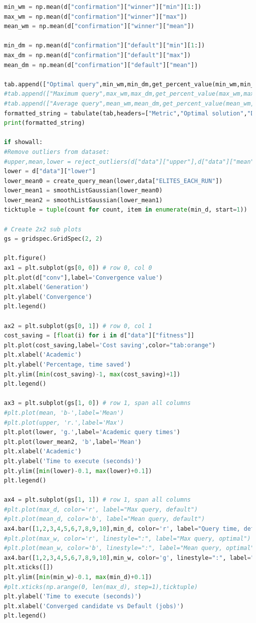 \documentclass[a4paper,english]{report}
\begin{document}
\begin{lstlisting}[language=Python, caption=plotting.py\, easily allows for visualization of results.]
min_wm = np.mean(d["confirmation"]["winner"]["min"][1:])
max_wm = np.mean(d["confirmation"]["winner"]["max"])
mean_wm = np.mean(d["confirmation"]["winner"]["mean"])

min_dm = np.mean(d["confirmation"]["default"]["min"][1:])
max_dm = np.mean(d["confirmation"]["default"]["max"])
mean_dm = np.mean(d["confirmation"]["default"]["mean"])

tab.append(["Optimal query",min_wm,min_dm,get_percent_value(min_wm,min_dm)])
#tab.append(["Maximum query",max_wm,max_dm,get_percent_value(max_wm,max_dm)])
#tab.append(["Average query",mean_wm,mean_dm,get_percent_value(mean_wm,mean_dm)])
formatted_string = tabulate(tab,headers=["Metric","Optimal solution","Default","Overhead saved"])
print(formatted_string)

if showall:
#Remove outliers from dataset:
#upper,mean,lower = reject_outliers(d["data"]["upper"],d["data"]["mean"],d["data"]["lower"])
lower = d["data"]["lower"]
lower_mean0 = create_query_mean(lower,data["ELITES_EACH_RUN"])
lower_mean1 = smoothListGaussian(lower_mean0)
lower_mean2 = smoothListGaussian(lower_mean1)
ticktuple = tuple(count for count, item in enumerate(min_d, start=1))

# Create 2x2 sub plots
gs = gridspec.GridSpec(2, 2)

plt.figure()
ax1 = plt.subplot(gs[0, 0]) # row 0, col 0
plt.plot(d["conv"],label='Convergence value')
plt.xlabel('Generation')
plt.ylabel('Convergence')
plt.legend()

ax2 = plt.subplot(gs[0, 1]) # row 0, col 1
cost_saving = [float(i) for i in d["data"]["fitness"]]
plt.plot(cost_saving,label='Cost saving',color="tab:orange")
plt.xlabel('Academic')
plt.ylabel('Percentage, time saved')
plt.ylim([min(cost_saving)-1, max(cost_saving)+1])
plt.legend()

ax3 = plt.subplot(gs[1, 0]) # row 1, span all columns
#plt.plot(mean, 'b-',label='Mean')
#plt.plot(upper, 'r.',label='Max')
plt.plot(lower, 'g.',label='Academic query times')
plt.plot(lower_mean2, 'b',label='Mean')
plt.xlabel('Academic')
plt.ylabel('Time to execute (seconds)')
plt.ylim([min(lower)-0.1, max(lower)+0.1])
plt.legend()

ax4 = plt.subplot(gs[1, 1]) # row 1, span all columns
#plt.plot(max_d, color='r', label="Max query, default")
#plt.plot(mean_d, color='b', label="Mean query, default")
ax4.bar([1,2,3,4,5,6,7,8,9,10],min_d, color='r', label="Query time, default",align="center")
#plt.plot(max_w, color='r', linestyle=":", label="Max query, optimal")
#plt.plot(mean_w, color='b', linestyle=":", label="Mean query, optimal")
ax4.bar([1,2,3,4,5,6,7,8,9,10],min_w, color='g', linestyle=":", label="Query time, optimal",align="center")
plt.xticks([])
plt.ylim([min(min_w)-0.1, max(min_d)+0.1])
#plt.xticks(np.arange(0, len(max_d), step=1),ticktuple)
plt.ylabel('Time to execute (seconds)')
plt.xlabel('Converged candidate vs Default (jobs)')
plt.legend()


\end{lstlisting}
\end{document}
